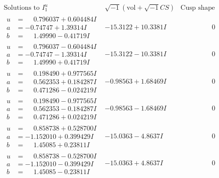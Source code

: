 \documentclass[1p]{elsarticle_modified}
\theoremstyle{definition}
\newcommand{\I}{\sqrt{-1}}
\begin{document}
$$\begin{array}{c|c|c}  
\text{Solutions to }I^u_{1}& \I (\text{vol} + \sqrt{-1}CS) & \text{Cusp shape}\\
 \hline 
\begin{aligned}
u &= \phantom{-}0.796037 + 0.604484 I \\
a &= -0.74747 + 1.39314 I \\
b &= \phantom{-}1.49990 - 0.41719 I\end{aligned}
 & -15.3122 + 10.3381 I & \phantom{-0.000000 } 0 \\ \hline\begin{aligned}
u &= \phantom{-}0.796037 - 0.604484 I \\
a &= -0.74747 - 1.39314 I \\
b &= \phantom{-}1.49990 + 0.41719 I\end{aligned}
 & -15.3122 - 10.3381 I & \phantom{-0.000000 } 0 \\ \hline\begin{aligned}
u &= \phantom{-}0.198490 + 0.977565 I \\
a &= \phantom{-}0.562353 + 0.184287 I \\
b &= \phantom{-}0.471286 - 0.024219 I\end{aligned}
 & -0.98563 + 1.68469 I & \phantom{-0.000000 } 0 \\ \hline\begin{aligned}
u &= \phantom{-}0.198490 - 0.977565 I \\
a &= \phantom{-}0.562353 - 0.184287 I \\
b &= \phantom{-}0.471286 + 0.024219 I\end{aligned}
 & -0.98563 - 1.68469 I & \phantom{-0.000000 } 0 \\ \hline\begin{aligned}
u &= \phantom{-}0.858738 + 0.528700 I \\
a &= -1.152010 + 0.399429 I \\
b &= \phantom{-}1.45085 + 0.23811 I\end{aligned}
 & -15.0363 - 4.8637 I & \phantom{-0.000000 } 0 \\ \hline\begin{aligned}
u &= \phantom{-}0.858738 - 0.528700 I \\
a &= -1.152010 - 0.399429 I \\
b &= \phantom{-}1.45085 - 0.23811 I\end{aligned}
 & -15.0363 + 4.8637 I & \phantom{-0.000000 } 0 \\ \hline\begin{aligned}

\end{aligned}
\end{array}$$
\end{document}
